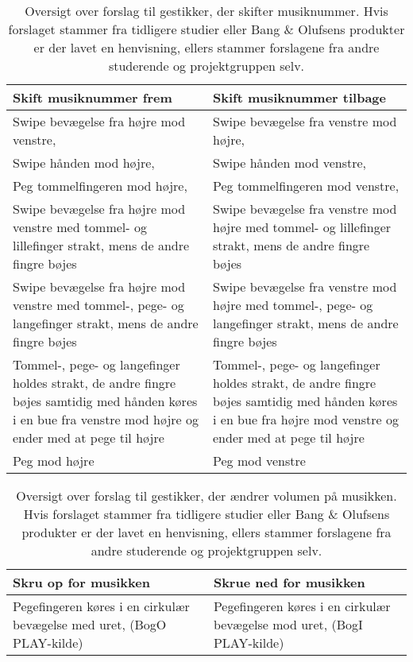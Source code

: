 \begin{table}[H]
	\centering
	\begin{tabular}{| p{6cm} | p{6cm} |}
		\hline
		\textbf{Skift musiknummer frem} & \textbf{Skift musiknummer tilbage} \\ \hline
		Swipe bevægelse fra højre mod venstre, \parencite[s. 48]{WEB:Beosound2, WEB:BeosoundMoment, PDF:UserDefinedGesturesTV} & Swipe bevægelse fra venstre mod højre, \parencite[s. 48]{PDF:UserDefinedGesturesTV} \\ \hline
		Swipe hånden mod højre, \parencite[s. 166] {PDF:ComparingInputModalities} & Swipe hånden mod venstre, \parencite[s. 166]{PDF:ComparingInputModalities}  \\ \hline
		Peg tommelfingeren mod højre, \parencite[s. 166]{PDF:ComparingInputModalities} & Peg tommelfingeren mod venstre, \parencite[s. 166]{PDF:ComparingInputModalities} \\ \hline
		Swipe bevægelse fra højre mod venstre med tommel- og lillefinger strakt, mens de andre fingre bøjes & Swipe bevægelse fra venstre mod højre med tommel- og lillefinger strakt, mens de andre fingre bøjes \\ \hline
		Swipe bevægelse fra højre mod venstre med tommel-, pege- og langefinger strakt, mens de andre fingre bøjes & Swipe bevægelse fra venstre mod højre med tommel-, pege- og langefinger strakt, mens de andre fingre bøjes \\ \hline
		Tommel-, pege- og langefinger holdes strakt, de andre fingre bøjes samtidig med hånden køres i en bue fra venstre mod højre og ender med at pege til højre & Tommel-, pege- og langefinger holdes strakt, de andre fingre bøjes samtidig med hånden køres i en bue fra højre mod venstre og ender med at pege til højre\\ \hline
		Peg mod højre & Peg mod venstre \\ \hline
		
		
	\end{tabular}
	\caption{Oversigt over forslag til gestikker, der skifter musiknummer. Hvis forslaget stammer fra tidligere studier eller Bang $\&$ Olufsens produkter er der lavet en henvisning, ellers stammer forslagene fra andre studerende og projektgruppen selv.}
	\label{tab:IndsamledeGestikkerSkift}
\end{table}
\noindent

\begin{table}[H]
	\centering
	\begin{tabular}{| p{6cm} | p{6cm} |}
		\hline
		\textbf{Skru op for musikken} & \textbf{Skrue ned for musikken} \\ \hline
		Pegefingeren køres i en cirkulær bevægelse med uret, (BogO PLAY-kilde) & Pegefingeren køres i en cirkulær bevægelse mod uret, (BogI PLAY-kilde) \\ \hline
		 
		
		
	\end{tabular}
	\caption{Oversigt over forslag til gestikker, der ændrer volumen på musikken. Hvis forslaget stammer fra tidligere studier eller Bang $\&$ Olufsens produkter er der lavet en henvisning, ellers stammer forslagene fra andre studerende og projektgruppen selv.}
	\label{tab:IndsamledeGestikkerVolumen}
\end{table}
\noindent
